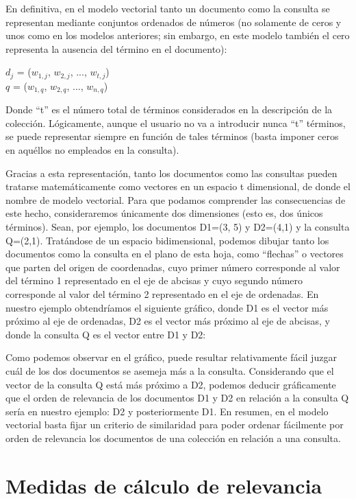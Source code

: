 \documentclass{article}
\begin{document}
En definitiva, en el modelo vectorial tanto un documento como la consulta se representan mediante conjuntos ordenados de números (no solamente de ceros y unos como en los modelos anteriores; sin embargo, en este modelo también el cero representa la ausencia del término en el documento):

\begin{center}
	$d_{j}$ = ($w_{1, j}$, $w_{2, j}$, ..., $w_{t, j}$) \\
	$q$ = ($w_{1, q}$, $w_{2, q}$, ..., $w_{n, q}$)
\end{center}

Donde “t” es el número total de términos considerados en la descripción de la colección. Lógicamente, aunque el usuario no va a introducir nunca “t” términos, se puede representar siempre en función de tales términos (basta imponer ceros en aquéllos no empleados en la consulta).

Gracias a esta representación, tanto los documentos como las consultas pueden tratarse matemáticamente como vectores en un espacio t dimensional, de donde el nombre de modelo vectorial. Para que podamos comprender las consecuencias de este hecho, consideraremos únicamente dos dimensiones (esto es, dos únicos términos). Sean, por ejemplo, los documentos D1=(3, 5) y D2=(4,1) y la consulta Q=(2,1). Tratándose de un espacio bidimensional, podemos dibujar tanto los documentos como la consulta en el plano de esta hoja, como “flechas” o vectores que parten del origen de coordenadas, cuyo primer número corresponde al valor del término 1 representado en el eje de abcisas y cuyo segundo número corresponde al valor del término 2 representado en el eje de ordenadas. En nuestro ejemplo obtendríamos el siguiente gráfico, donde D1 es el vector más próximo al eje de ordenadas, D2 es el vector más próximo al eje de abcisas, y donde la consulta Q es el vector entre D1 y D2:


Como podemos observar en el gráfico, puede resultar relativamente fácil juzgar cuál de los dos documentos se asemeja más a la consulta. Considerando que el vector de la consulta Q está más próximo a D2, podemos deducir gráficamente que el orden de relevancia de los documentos D1 y D2 en relación a la consulta Q sería en nuestro ejemplo: D2 y posteriormente D1. En resumen, en el modelo vectorial basta fijar un criterio de similaridad para poder ordenar fácilmente por orden de relevancia los documentos de una colección en relación a una consulta.

\section{Medidas de cálculo de relevancia}
\end{document}
